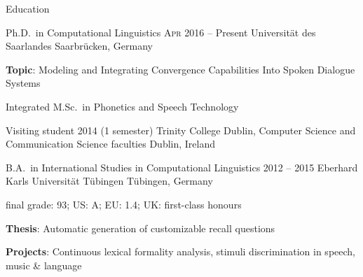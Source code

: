 \documentclass{resume} %
\begin{document}
\begin{rSection}{Education}

\begin{rSubsection}
	{Ph.D.\ in Computational Linguistics}
	{\textsc{Apr} 2016 -- Present}
	{Universität des Saarlandes}
	{Saarbrücken, Germany} %
	
	\setlength{\itemindent}{.7cm}
		
	\item \textbf{Topic}: Modeling and Integrating Convergence Capabilities Into Spoken Dialogue Systems %
	\item Integrated M.Sc.\ in Phonetics and Speech Technology
\end{rSubsection}

\begin{rSubsection}
	{Visiting student}
	{2014 (1 semester)}
	{Trinity College Dublin, Computer Science and Communication Science faculties}
	{Dublin, Ireland}
	
	\setlength{\itemindent}{.7cm}
	
	\item[]
\end{rSubsection}

\begin{rSubsection}
	{B.A.\ in International Studies in Computational Linguistics}
	{2012 -- 2015}
	{Eberhard Karls Universität Tübingen}
	{Tübingen, Germany}
	
	\vspace*{-.2cm}
	\item[]{final grade: 93; {\footnotesize US: A; EU: 1.4; UK: first-class honours}}
	\vspace*{.2cm}

	\setlength{\itemindent}{.7cm}
	
	\item \textbf{Thesis}: Automatic generation of customizable recall questions
	\item \textbf{Projects}: Continuous lexical formality analysis, stimuli discrimination in speech, music \& language
\end{rSubsection}

\end{rSection}
\end{document}
